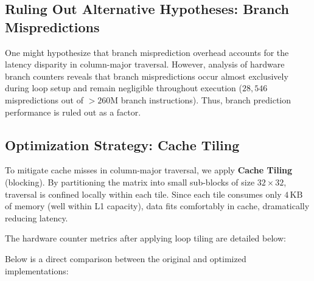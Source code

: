 \documentclass{article}
\begin{document}
	\subsection{Ruling Out Alternative Hypotheses: Branch Mispredictions}
	One might hypothesize that branch misprediction overhead accounts for the latency disparity in column-major traversal. However, analysis of hardware branch counters reveals that branch mispredictions occur almost exclusively during loop setup and remain negligible throughout execution ($28,546$ mispredictions out of $>260\text{M}$ branch instructions). Thus, branch prediction performance is ruled out as a factor.
	
	
	\subsection{Optimization Strategy: Cache Tiling}
	To mitigate cache misses in column-major traversal, we apply \textbf{Cache Tiling} (blocking). By partitioning the matrix into small sub-blocks of size $32 \times 32$, traversal is confined locally within each tile. Since each tile consumes only $4\,\text{KB}$ of memory (well within L1 capacity), data fits comfortably in cache, dramatically reducing latency.
	
	The hardware counter metrics after applying loop tiling are detailed below:
	
	\begin{table}[htbp]
		\centering
		\caption{Hardware Counters - Optimized (Tiled)}
		\label{tab:hardware_counters_optimized}
	\end{table}
	
	\FloatBarrier
	
	Below is a direct comparison between the original and optimized implementations:
	
\end{document}
